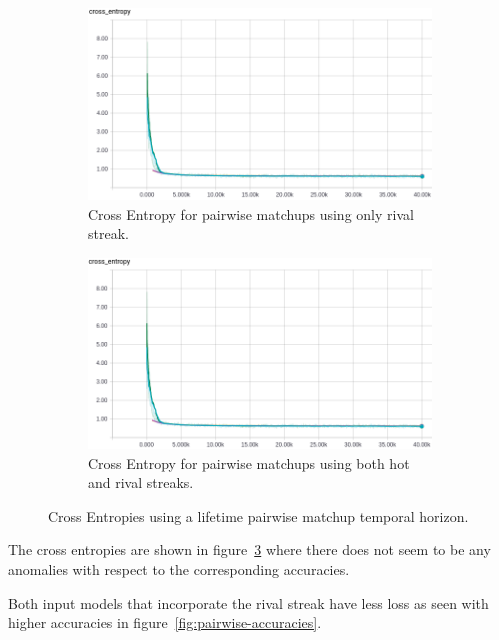 \documentclass{article} %
\begin{document}
\begin{figure}[!htb]
  \begin{subfigure}{0.5\textwidth}
    \includegraphics[width=\linewidth]{plots/model1/pairwise-matchups/streak-r/crossentropy.png}
    \caption{Cross Entropy for pairwise matchups using only rival streak.}\label{fig:pairwise-r-crossentropy}
  \end{subfigure}
  \begin{subfigure}{0.5\textwidth}
    \includegraphics[width=\linewidth]{plots/model1/pairwise-matchups/streak-hr/crossentropy.png}
    \caption{Cross Entropy for pairwise matchups using both hot and rival streaks.}\label{fig:pairwise-hr-crossentropy}
  \end{subfigure}
  \caption{Cross Entropies using a lifetime pairwise matchup temporal horizon.}
  \label{fig:pairwise-crossentropies}
\end{figure}

The cross entropies are shown in figure~\ref{fig:pairwise-crossentropies} where there does not seem to be any anomalies with respect to the corresponding accuracies.

Both input models that incorporate the rival streak have less loss as seen with higher accuracies in figure~\ref{fig:pairwise-accuracies}.
\end{document}

